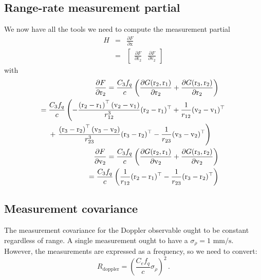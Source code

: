 \documentclass[12pt]{article}
\begin{document}
\subsection{Range-rate measurement partial}
We now have all the tools we need to compute the measurement partial
\begin{eqnarray*}
H &=& \frac{\partial F}{\partial \mathrm{x}} \\
 &=& \begin{bmatrix} \frac{\partial F}{\partial\mathrm{r_2}} & \frac{\partial F}{\partial\mathrm{v_2}} \end{bmatrix}
\end{eqnarray*}
with
\begin{align}
\begin{split}
\frac{\partial F}{\partial\mathrm{r_2}} ={}& \frac{C_3 f_q}{c}\left( \frac{\partial G(\vecr_2, \vecr_1)}{\partial \vecr_2} + \frac{\partial G(\vecr_3, \vecr_2)}{\partial \vecr_2}\right)
\end{split} \nonumber\\
\begin{split} ={}& \frac{C_3 f_q}{c}\left( %
 -\frac{\left(\vecr_2 - \vecr_1\right)^\top(\vecv_2 - \vecv_1)}{r_{12}^3}(\vecr_2 - \vecr_1)^\top + \frac{1}{r_{12}} (\vecv_2 - \vecv_1)^\top \right. \\
& + \left. \frac{\left(\vecr_3 - \vecr_2\right)^\top(\vecv_3 - \vecv_2)}{r_{23}^3}(\vecr_3 - \vecr_2)^\top - \frac{1}{r_{23}} (\vecv_3 - \vecv_2)^\top\right)
 \end{split} \\
\begin{split}
\frac{\partial F}{\partial\mathrm{v_2}} ={}& \frac{C_3 f_q}{c}\left( \frac{\partial G(\vecr_2, \vecr_1)}{\partial \vecv_2} + \frac{\partial G(\vecr_3, \vecr_2)}{\partial \vecv_2}\right)
\end{split} \nonumber\\
\begin{split}
={}& \frac{C_3 f_q}{c} \left( \frac{1}{r_{12}} (\vecr_2 - \vecr_1)^\top - \frac{1}{r_{23}} (\vecr_3 - \vecr_2)^\top \right)
\end{split}
\end{align}

\subsection{Measurement covariance}
The measurement covariance for the Doppler observable ought to be constant regardless of range. A single measurement ought to have a $\sigma_{\dot{\rho}} = 1\text{ mm/s}$. However, the measurements are expressed as a frequency, so we need to convert:
\begin{equation}
R_\text{doppler} = \left(\frac{C_e f_q}{c}\sigma_{\dot{\rho}}\right)^2\,\text{.}
\end{equation}
\end{document}
